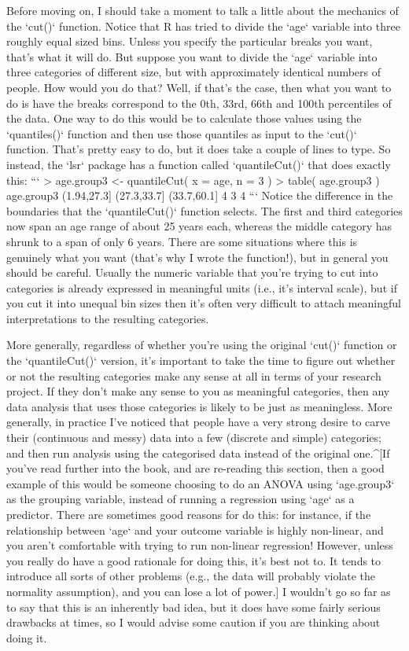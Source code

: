 Before moving on, I should take a moment to talk a little about the mechanics of the `cut()` function. Notice that R has tried to divide the `age` variable into three roughly equal sized bins. Unless you specify the particular breaks you want, that's what it will do. But suppose you want to divide the `age` variable into three categories of different size, but with approximately identical numbers of people. How would you do that? Well, if that's the case, then what you want to do is have the breaks correspond to the 0th, 33rd, 66th and 100th percentiles of the data. One way to do this would be to calculate those values using the `quantiles()` function and then use those quantiles as input to the `cut()` function. That's pretty easy to do, but it does take a couple of lines to type. So instead, the `lsr` package has a function called `quantileCut()` that does exactly this:
```
> age.group3 <- quantileCut( x = age, n = 3 )
> table( age.group3 )
age.group3
(1.94,27.3] (27.3,33.7] (33.7,60.1] 
          4           3           4 
```
Notice the difference in the boundaries that the `quantileCut()` function selects. The first and third categories now span an age range of about 25 years each, whereas the middle category has shrunk to a span of only 6 years. There are some situations where this is genuinely what you want (that's why I wrote the function!), but in general you should be careful. Usually the numeric variable that you're trying to cut into categories is already expressed in meaningful units (i.e., it's interval scale), but if you cut it into unequal bin sizes then it's often very difficult to attach meaningful interpretations to the resulting categories. 

More generally, regardless of whether you're using the original `cut()` function or the `quantileCut()` version, it's important to take the time to figure out whether or not the resulting categories make any sense at all in terms of your research project. If they don't make any sense to you as meaningful categories, then any data analysis that uses those categories is likely to be just as meaningless. More generally, in practice I've noticed that people have a very strong desire to carve their (continuous and messy) data into a few (discrete and simple) categories; and then run analysis using the categorised data instead of the original one.^[If you've read further into the book, and are re-reading this section, then a good example of this would be someone choosing to do an ANOVA using `age.group3` as the grouping variable, instead of running a regression using `age` as a predictor. There are sometimes good reasons for do this: for instance, if the relationship between `age` and your outcome variable is highly non-linear, and you aren't comfortable with trying to run non-linear regression! However, unless you really do have a good rationale for doing this, it's best not to. It tends to introduce all sorts of other problems (e.g., the data will probably violate the normality assumption), and you can lose a lot of power.] I wouldn't go so far as to say that this is an inherently bad idea, but it does have some fairly serious drawbacks at times, so I would advise some caution if you are thinking about doing it. 




